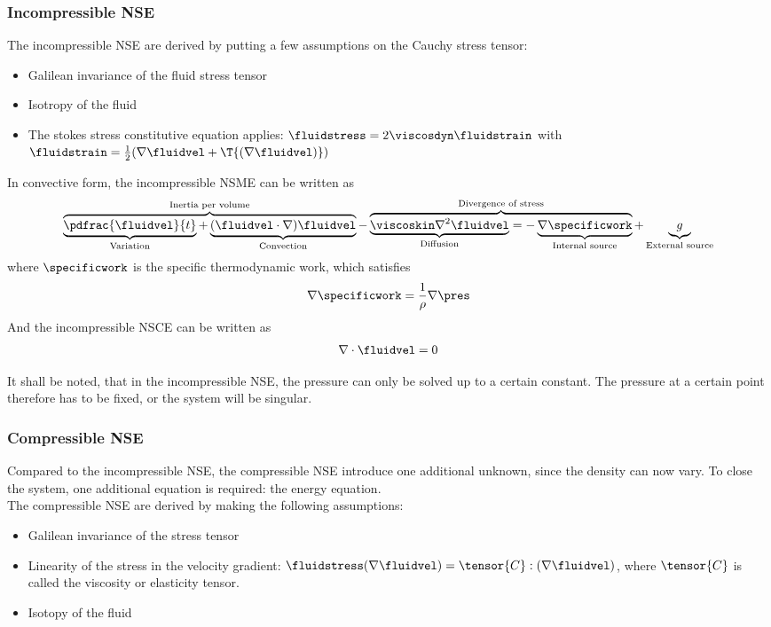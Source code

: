 \documentclass[../main.tex]{subfiles}
\begin{document}
\subsubsection{Incompressible \acl{NSE}}
The incompressible \ac{NSE} are derived by putting a few assumptions on the Cauchy stress tensor:
\begin{itemize}
\item Galilean invariance of the fluid stress tensor
\item Isotropy of the fluid
\item The stokes stress constitutive equation applies: $\fluidstress=2 \viscosdyn \fluidstrain$ with $\fluidstrain=\frac{1}{2}(\nabla \fluidvel+\T{(\nabla \fluidvel)})$
\end{itemize}

In convective form, the incompressible \ac{NSME} can be written as
\begin{align}\label{eq:nsg_incompressible}
\overbrace{
           \underbrace{\pdfrac{\fluidvel}{t}}_{\text{Variation}}  +
          \underbrace{(\fluidvel\cdot\nabla)\fluidvel}_{\text{Convection}}
          }^{\text{Inertia per volume}}
 -
\overbrace{
           \underbrace{\viscoskin\nabla^2\fluidvel}_{\text{Diffusion}} =
          -\underbrace{\nabla\specificwork}_{\text{Internal source}}
          }^{\text{Divergence of stress}}
+
\underbrace{g}_{\text{External source}}
\end{align}
where $\specificwork$ is the specific thermodynamic work, which satisfies
\begin{align}
\nabla\specificwork =
\frac{1}{\rho}\nabla\pres
\end{align}
And the incompressible \ac{NSCE} can be written as
\begin{align}
\nabla\cdot\fluidvel=0
\end{align}

It shall be noted, that in the incompressible \ac{NSE}, the pressure can only be solved up to a certain constant. The pressure at a certain point therefore has to be fixed, or the system will be singular.


\subsubsection{Compressible \acl{NSE}}\label{sec:nsg_compressible}
Compared to the incompressible \ac{NSE}, the compressible \ac{NSE} introduce one additional unknown, since the density can now vary. To close the system, one additional equation is required: the energy equation.\\
The compressible \ac{NSE} are derived by making the following assumptions:
\begin{itemize}
\item Galilean invariance of the stress tensor
\item Linearity of the stress in the velocity gradient: $\fluidstress(\nabla\fluidvel)=\tensor{C}:(\nabla\fluidvel)$, where $\tensor{C}$ is called the viscosity or elasticity tensor.
\item Isotopy of the fluid
\end{itemize}
\end{document}
